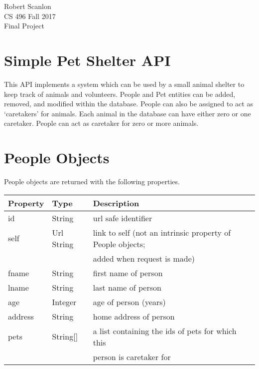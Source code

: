 \documentclass{article}
\begin{document}
\noindent
Robert Scanlon \\
CS 496 Fall 2017 \\
Final Project

\section*{Simple Pet Shelter API}
This API implements a system which can be used by a small animal shelter to
keep track of animals and volunteers. People and Pet entities can be
added, removed, and modified within the database. People can also be assigned to
act as `caretakers' for animals. Each animal in the database can have either 
zero or one caretaker. People can act as caretaker for zero or more animals.

\section*{People Objects}
People objects are returned with the following properties. \\
\begin{tabular}{| l | l | l |}
	\hline
	\textbf{Property}     & \textbf{Type}   & \textbf{Description} \\
	\hline
	id                    & String          & url safe identifier \\
	\hline
	self                  & Url String      & link to self (not an intrinsic property of People objects; \\
	                      &                 & added when request is made) \\
	\hline
	fname		      & String          & first name of person \\
	\hline
	lname	              & String          & last name of person \\
	\hline
	age	              & Integer         & age of person (years) \\
	\hline
	address               & String          & home address of person \\
	\hline
	pets	              & String[]        & a list containing the ids of pets for which this \\
	                      &                 & person is caretaker for \\
	\hline
\end{tabular}
\end{document}
